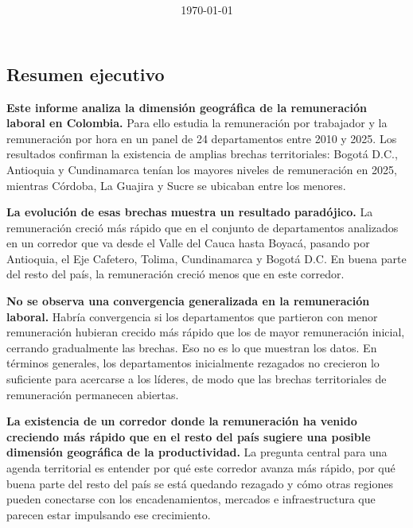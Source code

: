 \documentclass[12pt, a4paper]{article}
\title{\reporttitle\\\reportsubtitle}
\author{\reportauthorone \and \reportauthortwo}
\date{\today}
\begin{document}


\begin{mdframed}[
  linewidth=1pt,
  linecolor=gray!60,
  backgroundcolor=gray!6,
  innertopmargin=12pt,
  innerbottommargin=12pt,
  innerleftmargin=14pt,
  innerrightmargin=14pt
]
\section*{Resumen ejecutivo}

\textbf{Este informe analiza la dimensión geográfica de la remuneración laboral en Colombia.} Para ello estudia la remuneración por trabajador y la remuneración por hora en un panel de 24 departamentos entre 2010 y 2025. Los resultados confirman la existencia de amplias brechas territoriales: Bogotá D.C., Antioquia y Cundinamarca tenían los mayores niveles de remuneración en 2025, mientras Córdoba, La Guajira y Sucre se ubicaban entre los menores.

\textbf{La evolución de esas brechas muestra un resultado paradójico.} La remuneración creció más rápido que en el conjunto de departamentos analizados en un corredor que va desde el Valle del Cauca hasta Boyacá, pasando por Antioquia, el Eje Cafetero, Tolima, Cundinamarca y Bogotá D.C. En buena parte del resto del país, la remuneración creció menos que en este corredor.

\textbf{No se observa una convergencia generalizada en la remuneración laboral.} Habría convergencia si los departamentos que partieron con menor remuneración hubieran crecido más rápido que los de mayor remuneración inicial, cerrando gradualmente las brechas. Eso no es lo que muestran los datos. En términos generales, los departamentos inicialmente rezagados no crecieron lo suficiente para acercarse a los líderes, de modo que las brechas territoriales de remuneración permanecen abiertas.

\textbf{La existencia de un corredor donde la remuneración ha venido creciendo más rápido que en el resto del país sugiere una posible dimensión geográfica de la productividad.} La pregunta central para una agenda territorial es entender por qué este corredor avanza más rápido, por qué buena parte del resto del país se está quedando rezagado y cómo otras regiones pueden conectarse con los encadenamientos, mercados e infraestructura que parecen estar impulsando ese crecimiento.
\end{mdframed}

\newpage
\tableofcontents
\newpage


\end{document}
